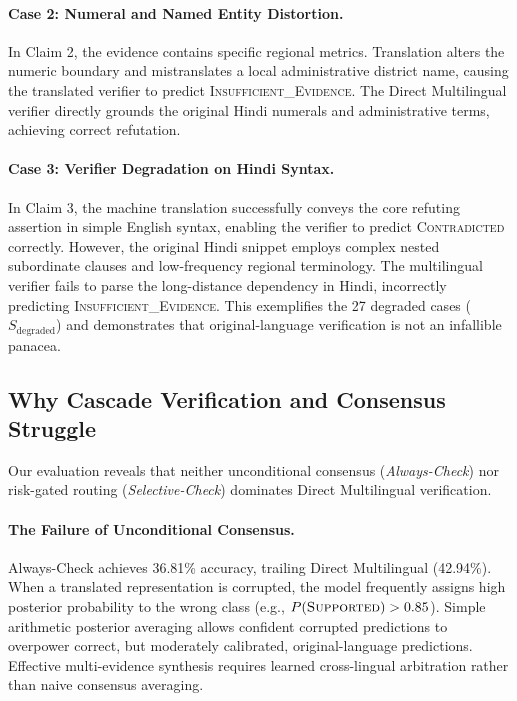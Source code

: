 \paragraph{Case 2: Numeral and Named Entity Distortion.}
In Claim 2, the evidence contains specific regional metrics. Translation alters the numeric boundary and mistranslates a local administrative district name, causing the translated verifier to predict \textsc{Insufficient\_Evidence}. The Direct Multilingual verifier directly grounds the original Hindi numerals and administrative terms, achieving correct refutation.

\paragraph{Case 3: Verifier Degradation on Hindi Syntax.}
In Claim 3, the machine translation successfully conveys the core refuting assertion in simple English syntax, enabling the verifier to predict \textsc{Contradicted} correctly. However, the original Hindi snippet employs complex nested subordinate clauses and low-frequency regional terminology. The multilingual verifier fails to parse the long-distance dependency in Hindi, incorrectly predicting \textsc{Insufficient\_Evidence}. This exemplifies the 27 degraded cases ($S_{\text{degraded}}$) and demonstrates that original-language verification is not an infallible panacea.

\subsection{Why Cascade Verification and Consensus Struggle}
Our evaluation reveals that neither unconditional consensus (\emph{Always-Check}) nor risk-gated routing (\emph{Selective-Check}) dominates Direct Multilingual verification.

\paragraph{The Failure of Unconditional Consensus.}
Always-Check achieves 36.81\% accuracy, trailing Direct Multilingual (42.94\%). When a translated representation is corrupted, the model frequently assigns high posterior probability to the wrong class (e.g., $P(\textsc{Supported}) > 0.85$). Simple arithmetic posterior averaging allows confident corrupted predictions to overpower correct, but moderately calibrated, original-language predictions. Effective multi-evidence synthesis requires learned cross-lingual arbitration rather than naive consensus averaging.

